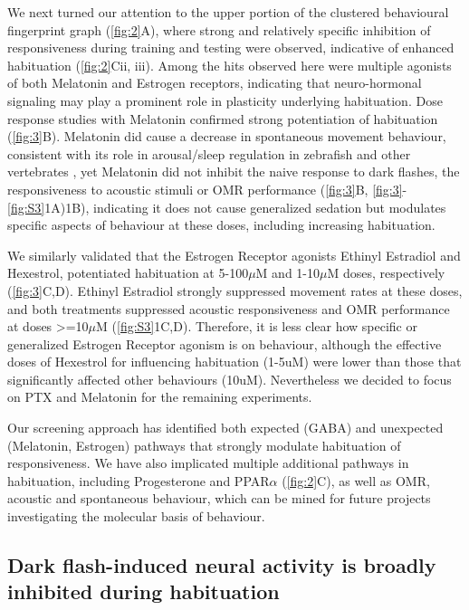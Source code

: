 \documentclass[9pt,lineno]{RandlettLab_elife}
\begin{document}
We next turned our attention to the upper portion of the clustered behavioural fingerprint graph (\autoref{fig:2}A), where strong and relatively specific inhibition of responsiveness during training and testing were observed, indicative of enhanced habituation (\autoref{fig:2}Cii, iii). Among the hits observed here were multiple agonists of both Melatonin and Estrogen receptors, indicating that neuro-hormonal signaling may play a prominent role in plasticity underlying habituation. Dose response studies with Melatonin confirmed strong potentiation of habituation (\autoref{fig:3}B). Melatonin did cause a decrease in spontaneous movement behaviour, consistent with its role in arousal/sleep regulation in zebrafish and other vertebrates \cite{Gandhi2015-vw, Zhdanova2001-dq}, yet Melatonin did not inhibit the naive response to dark flashes, the responsiveness to acoustic stimuli or OMR performance (\autoref{fig:3}B, \autoref{fig:3}-\autoref{fig:S3}1A)1B), indicating it does not cause generalized sedation but modulates specific aspects of behaviour at these doses, including increasing habituation. 

We similarly validated that the Estrogen Receptor agonists Ethinyl Estradiol and Hexestrol, potentiated habituation at 5-100$\mu$M and 1-10$\mu$M doses, respectively (\autoref{fig:3}C,D). Ethinyl Estradiol strongly suppressed movement rates at these doses, and both treatments suppressed acoustic responsiveness and OMR performance at doses >=10$\mu$M (\autoref{fig:S3}1C,D). Therefore, it is less clear how specific or generalized Estrogen Receptor agonism is on behaviour, although the effective doses of Hexestrol for influencing habituation (1-5uM) were lower than those that significantly affected other behaviours (10uM). Nevertheless we decided to focus on PTX and Melatonin for the remaining experiments. 


Our screening approach has identified both expected (GABA) and unexpected (Melatonin, Estrogen) pathways that strongly modulate habituation of responsiveness. We have also implicated multiple additional pathways in habituation, including Progesterone and PPAR$\alpha$ (\autoref{fig:2}C), as well as OMR, acoustic and spontaneous behaviour, which can be mined for future projects investigating the molecular basis of behaviour. 

\subsection{Dark flash-induced neural activity is broadly inhibited during habituation}
\end{document}
